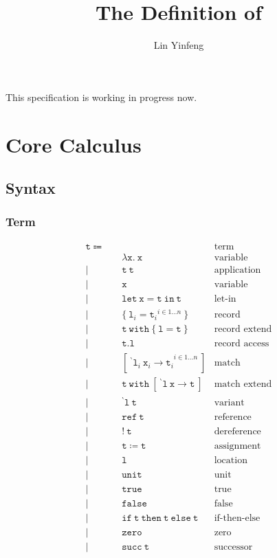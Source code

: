 \documentclass[a4paper]{article}
\title{The Definition of \theLang}
\author{Lin Yinfeng}
\newcommand{\code}{\mathtt}
\newcommand{\backtick}{{}^{\backprime}}
\begin{document}
\maketitle

This specification is working in progress now.

\section{Core Calculus}

\subsection{Syntax}

\subsubsection{Term}

\begin{align*}
\code{t} \Coloneqq \quad & & \text{term} \\
& \code{\lambda x.\ x} & \text{variable} \\
| \quad & \code{t\ t} & \text{application} \\
| \quad & \code{x} & \text{variable} \\
| \quad & \code{let\ x = t\ in\ t} & \text{let-in} \\
| \quad & \{\ {\code{l}_i = \code{t}_i}^{i \in 1\dots n}\ \} & \text{record} \\
| \quad & \code{t\ with\ \{\ l = t\ \}} & \text{record extend} \\
| \quad & \code{t.l} & \text{record access} \\
| \quad & [ {\code{\ \backtick l}_i\ \code{x}_i \rightarrow \code{t}_i}^{i \in 1\dots n} \ ] & \text{match} \\
| \quad & \code{t\ with\ [\ \backtick l\ x \rightarrow t\ ]} & \text{match extend} \\
| \quad & \code{\backtick l\ t} & \text{variant} \\
| \quad & \code{ref\ t} & \text{reference} \\
| \quad & \code{!\ t} & \text{dereference} \\
| \quad & \code{t \coloneqq t} & \text{assignment} \\
| \quad & \code{l} & \text{location} \\
| \quad & \code{unit} & \text{unit} \\
| \quad & \code{true} & \text{true} \\
| \quad & \code{false} & \text{false} \\
| \quad & \code{if\ t\ then\ t\ else\ t} & \text{if-then-else} \\
| \quad & \code{zero} & \text{zero} \\
| \quad & \code{succ\ t} & \text{successor}
\end{align*}
\end{document}
